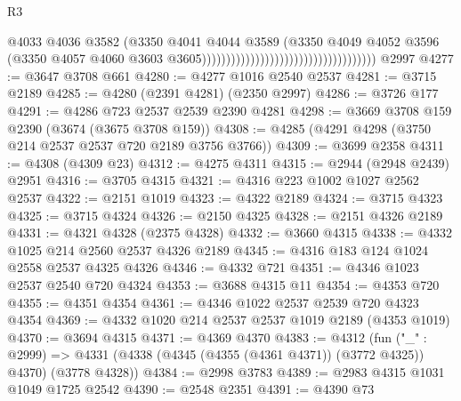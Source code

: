 \begin{lexlean}{R3}
\begin{coremodule}
                                                                      @4033
                                                                      @4036
                                                                      @3582
                                                                      (@3350
                                                                        @4041
                                                                        @4044
                                                                        @3589
                                                                        (@3350
                                                                          @4049
                                                                          @4052
                                                                          @3596
                                                                          (@3350
                                                                            @4057
                                                                            @4060
                                                                            @3603
                                                                            @3605))))))))))))))))))))))))))))))))))))
    @2997
@4277 := @3647 @3708 @661
@4280 := @4277 @1016 @2540 @2537
@4281 := @3715 @2189
@4285 := @4280 (@2391 @4281) (@2350 @2997)
@4286 := @3726 @177
@4291 := @4286 @723 @2537 @2539 @2390 @4281
@4298 := @3669 @3708 @159 @2390 (@3674 (@3675 @3708 @159))
@4308 := @4285 (@4291 @4298 (@3750 @214 @2537 @2537 @720 @2189 @3756 @3766))
@4309 := @3699 @2358
@4311 := @4308 (@4309 @23)
@4312 := @4275 @4311
@4315 := @2944 (@2948 @2439) @2951
@4316 := @3705 @4315
@4321 := @4316 @223 @1002 @1027 @2562 @2537
@4322 := @2151 @1019
@4323 := @4322 @2189
@4324 := @3715 @4323
@4325 := @3715 @4324
@4326 := @2150 @4325
@4328 := @2151 @4326 @2189
@4331 := @4321 @4328 (@2375 @4328)
@4332 := @3660 @4315
@4338 := @4332 @1025 @214 @2560 @2537 @4326 @2189
@4345 := @4316 @183 @124 @1024 @2558 @2537 @4325 @4326
@4346 := @4332 @721
@4351 := @4346 @1023 @2537 @2540 @720 @4324
@4353 := @3688 @4315 @11
@4354 := @4353 @720
@4355 := @4351 @4354
@4361 := @4346 @1022 @2537 @2539 @720 @4323 @4354
@4369 := @4332 @1020 @214 @2537 @2537 @1019 @2189 (@4353 @1019)
@4370 := @3694 @4315
@4371 := @4369 @4370
@4383 := @4312
    (fun ("_" : @2999) =>
    @4331 (@4338 (@4345 (@4355 (@4361 @4371)) (@3772 @4325)) @4370) (@3778 @4328))
@4384 := @2998 @3783
@4389 := @2983 @4315 @1031 @1049 @1725 @2542
@4390 := @2548 @2351
@4391 := @4390 @73

\end{coremodule}
\end{lexlean}
